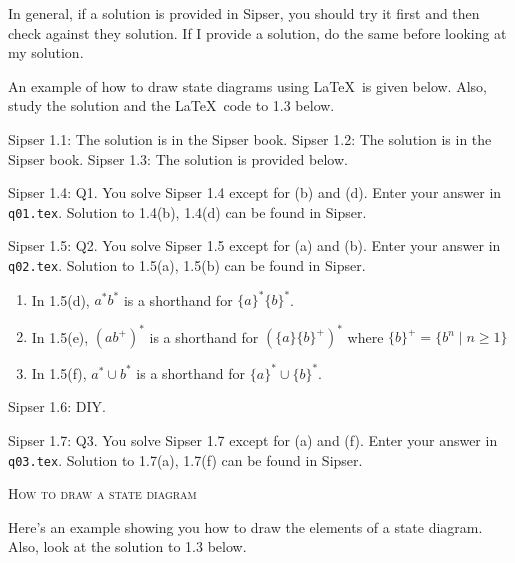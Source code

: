 

\renewcommand\AUTHOR{John Doe}


\topmatter


In general, if a solution is provided in Sipser, you should try it first
and then check against they solution.
If I provide a solution, do the same before looking at my solution.

An example of how to draw state diagrams using \LaTeX\ is given below.
Also, study the solution and the \LaTeX\ code to 1.3 below.

\begin{enumerate}
\li Sipser 1.1: The solution is in the Sipser book.
\li Sipser 1.2: The solution is in the Sipser book.
\li Sipser 1.3: The solution is provided below.

\li Sipser 1.4: Q1. You solve Sipser 1.4 except for (b) and (d).
Enter your answer in \verb!q01.tex!.
Solution to 1.4(b), 1.4(d) can be found in Sipser. 

\li Sipser 1.5: Q2. You solve Sipser 1.5 except for (a) and (b).
Enter your answer in \verb!q02.tex!.
Solution to 1.5(a), 1.5(b) can be found in Sipser.
\begin{enumerate}[nosep]
\item In 1.5(d), $a^{*}b^{*}$ is a shorthand for $\{a\}^{*} \{b\}^{*}$.
\item In 1.5(e), $(ab^{+})^{*}$ is a shorthand for $(\{a\}\{b\}^{+})^{*}$
where $\{b\}^+ = \{b^n \mid n \geq 1\}$
\item In 1.5(f), $a^{*} \cup b^{*}$ is a shorthand for $\{a\}^{*} \cup \{b\}^{*}$.
\end{enumerate}

\li Sipser 1.6: DIY.

\li Sipser 1.7: Q3.
You solve Sipser 1.7 except for (a) and (f).
Enter your answer in \verb!q03.tex!.
Solution to 1.7(a), 1.7(f) can be found in Sipser.
\end{enumerate}


\newpage
\textsc{How to draw a state diagram}

Here's an example showing you how to draw the elements of a state diagram.
Also, look at the solution to 1.3 below.

